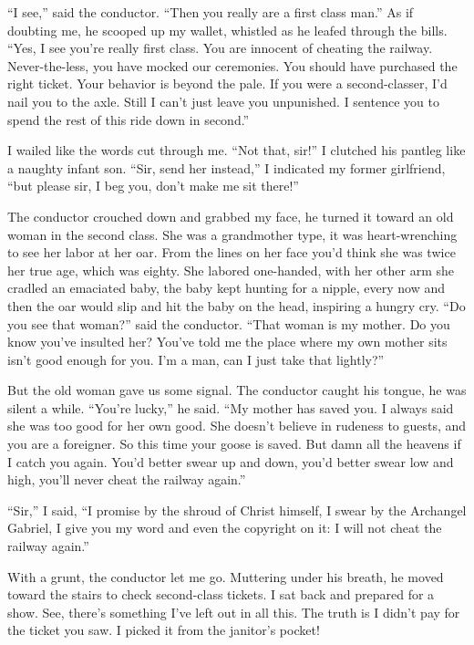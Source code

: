 \documentclass[oneside]{book}
\begin{document}
``I see,'' said the conductor.  ``Then you really are a first class man.''  As if doubting me, he scooped up my wallet,
whistled as he leafed through the bills.  ``Yes, I see you're really first class.  You are innocent of cheating the railway.
Never-the-less, you have mocked our ceremonies.  You should have purchased the right ticket.  Your behavior
is beyond the pale.  If you were a second-classer, I'd nail you to the axle.  Still I can't just leave you unpunished.
I sentence you to spend the rest of this ride down in second.''

I wailed like the words cut through me.  ``Not that, sir!''  I clutched his pantleg like a naughty infant son.  ``Sir, send
her instead,'' I indicated my former girlfriend, ``but please sir, I beg you, don't make me sit there!''

The conductor crouched down and grabbed my face, he turned it toward an old woman in the second class.  She
was a grandmother type, it was heart-wrenching to see her labor at her oar.  From the lines on her face you'd
think she was twice her true age, which was eighty.  She labored one-handed, with her other arm she cradled an emaciated
baby, the baby kept hunting for a nipple, every now and then the oar would slip and hit the baby on the head,
inspiring a hungry cry.  ``Do you see that woman?'' said the conductor.  ``That woman is my mother.  Do you know
you've insulted her?  You've told me the place where my own mother sits isn't good enough for you.  I'm a man,
can I just take that lightly?''

But the old woman gave us some signal.  The conductor caught his tongue, he was silent a while.
``You're lucky,'' he said.  ``My mother has saved you.  I always said she was too good for her own good.
She doesn't believe in rudeness to guests, and you are a foreigner.  So this time your goose is saved.
But damn all the heavens if I catch you again.  You'd better swear up and down, you'd better swear
low and high, you'll never cheat the railway again.''

``Sir,'' I said, ``I promise by the shroud of Christ himself, I swear by the Archangel Gabriel, I give you my word and
even the copyright on it:  I will not cheat the railway again.''

With a grunt, the conductor let me go.  Muttering under his breath, he moved toward the stairs to check second-class
tickets.  I sat back and prepared for a show.  See, there's something I've left out in all this.  The truth
is I didn't pay for the ticket you saw.  I picked it from the janitor's pocket!
\end{document}
